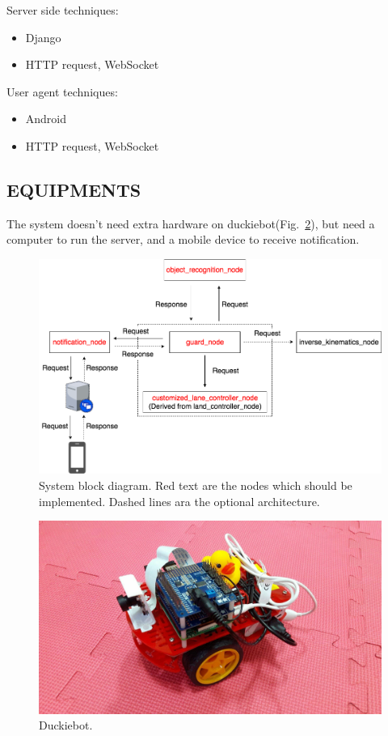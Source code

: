 \documentclass[letterpaper, 10 pt, conference]{ieeeconf}  %
\begin{document}
Server side techniques:
\begin{itemize}
  \item Django
  \item HTTP request, WebSocket
\end{itemize}

User agent techniques:
\begin{itemize}
  \item Android
  \item HTTP request, WebSocket
\end{itemize}

\subsection{EQUIPMENTS} 
The system doesn't need extra hardware on duckiebot(Fig.~\ref{figure:duckiebot}),
but need a computer to run the server, and a mobile device to receive notification.

\begin{figure}[h] %
\includegraphics[width=1\columnwidth]{csp2017}
\centering
\caption{System block diagram. Red text are the nodes which should be implemented. Dashed lines ara the optional architecture.}
\label{figure:system_block_diagram}
\end{figure}

\begin{figure}[h] %
\includegraphics[width=0.8\columnwidth]{duckiebot}
\centering
\caption{Duckiebot.}
 \label{figure:duckiebot}
\end{figure}
\end{document}

